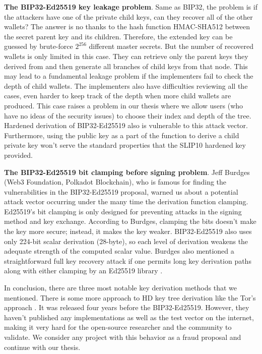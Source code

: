 \bigskip
{\textbf{The BIP32-Ed25519 key leakage problem}}. Same as BIP32, the problem is if the attackers have one of the private child keys, can they recover all of the other wallets? The answer is no thanks to the hash function HMAC-SHA512 between the secret parent key and its children. Therefore, the extended key can be guessed by brute-force $2^{256}$ different master secrets. But the number of recovered wallets is only limited in this case. They can retrieve only the parent keys they derived from and then generate all branches of child keys from that node. This may lead to a fundamental leakage problem if the implementers fail to check the depth of child wallets. The implementers also have difficulties reviewing all the cases, even harder to keep track of the depth when more child wallets are produced. This case raises a problem in our thesis where we allow users (who have no ideas of the security issues) to choose their index and depth of the tree. Hardened derivation of BIP32-Ed25519 also is vulnerable to this attack vector. Furthermore, using the public key as a part of the function to derive a child private key won’t serve the standard properties that the SLIP10 hardened key provided.

\bigskip
{\textbf{The BIP32-Ed25519 bit clamping before signing problem}}. Jeff Burdges (Web3 Foundation, Polkadot Blockchain), who is famous for finding the vulnerabilities in the BIP32-Ed25519 proposal, warned us about a potential attack vector occurring under the many time the derivation function clamping. Ed25519’s bit clamping is only designed for preventing attacks in the signing method and key exchange. According to Burdges, clamping the bits doesn’t make the key more secure; instead, it makes the key weaker. BIP32-Ed25519 also uses only 224-bit scalar derivation (28-byte), so each level of derivation weakens the adequate strength of the computed scalar value.
Burdges also mentioned a straightforward full key recovery attack if one permits long key derivation paths along with either clamping by an Ed25519 library \cite{Jeff}.

In conclusion, there are three most notable key derivation methods that we mentioned. There is some more approach to HD key tree derivation like the Tor’s approach \cite{torspec}. It was released four years before the BIP32-Ed25519. However, they haven’t published any implementations as well as the test vector on the internet, making it very hard for the open-source researcher and the community to validate. We consider any project with this behavior as a fraud proposal and continue with our thesis.

